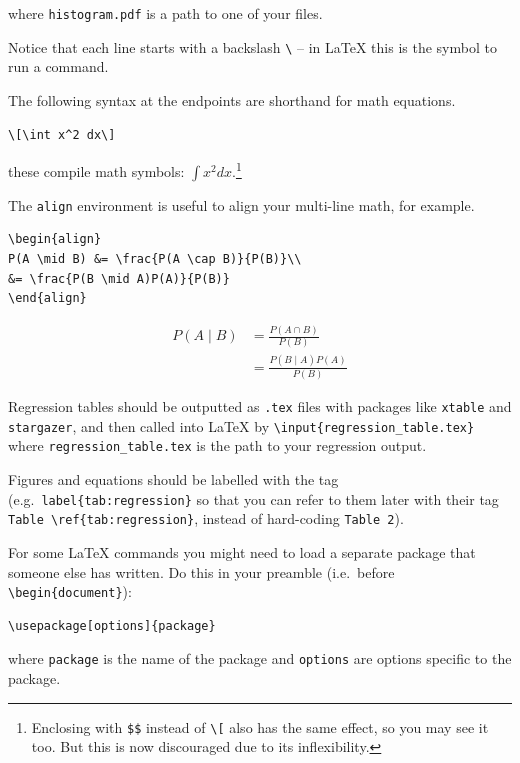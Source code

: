 \documentclass[
]{book}
\theoremstyle{definition}
\theoremstyle{definition}
\theoremstyle{definition}
\theoremstyle{remark}
\begin{document}
where \texttt{histogram.pdf} is a path to one of your files.

Notice that each line starts with a backslash \texttt{\textbackslash{}} -- in LaTeX this is the symbol to run a command.

The following syntax at the endpoints are shorthand for math equations.

\begin{verbatim}
\[\int x^2 dx\]
\end{verbatim}

these compile math symbols: \(\displaystyle \int x^2 dx.\)\footnote{Enclosing with \texttt{\$\$} instead of \texttt{\textbackslash{}{[}} also has the same effect, so you may see it too. But this is now discouraged due to its inflexibility.}

The \texttt{align} environment is useful to align your multi-line math, for example.

\begin{verbatim}
\begin{align}
P(A \mid B) &= \frac{P(A \cap B)}{P(B)}\\
&= \frac{P(B \mid A)P(A)}{P(B)}
\end{align}
\end{verbatim}

\begin{align}
P(A \mid B) &= \frac{P(A \cap B)}{P(B)}\\
&= \frac{P(B \mid A)P(A)}{P(B)}
\end{align}

Regression tables should be outputted as \texttt{.tex} files with packages like \texttt{xtable} and \texttt{stargazer}, and then called into LaTeX by \texttt{\textbackslash{}input\{regression\_table.tex\}} where \texttt{regression\_table.tex} is the path to your regression output.

Figures and equations should be labelled with the tag (e.g.~\texttt{label\{tab:regression\}} so that you can refer to them later with their tag \texttt{Table\ \textbackslash{}ref\{tab:regression\}}, instead of hard-coding \texttt{Table\ 2}).

For some LaTeX commands you might need to load a separate package that someone else has written. Do this in your preamble (i.e.~before \texttt{\textbackslash{}begin\{document\}}):

\begin{verbatim}
\usepackage[options]{package}
\end{verbatim}

where \texttt{package} is the name of the package and \texttt{options} are options specific to the package.
\end{document}
